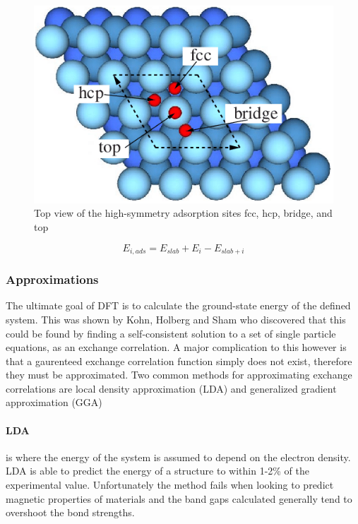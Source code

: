 \begin{figure}[H]
    \includegraphics[width=\linewidth]{figures/fccsites.png}
    \caption{Top view of the high-symmetry adsorption sites fcc, hcp, bridge, and top \cite{Zeng2009}}
    \label{fccsites}
  \end{figure}

\begin{equation} \label{adseqn}
    E_{i,ads} = E_{slab} + E_i - E_{slab + i}
\end{equation}

\subsubsection{Approximations}
The ultimate goal of DFT is to calculate the ground-state energy of the defined system. This was shown by Kohn, Holberg and Sham who discovered that this could be found by finding a self-consistent solution to a set of single particle equations, as an exchange correlation. A major complication to this however is that a gaurenteed exchange correlation function simply does not exist, therefore they must be approximated. Two common methods for approximating exchange correlations are local density approximation (LDA) and generalized gradient approximation (GGA)

\paragraph{LDA} is where the energy of the system is assumed to depend on the electron density. LDA is able to predict the energy of a structure to within 1-2\% of the experimental value. Unfortunately the method fails when looking to predict magnetic properties of materials and the band gaps calculated generally tend to overshoot the bond strengths. \cite{dftbook1}

